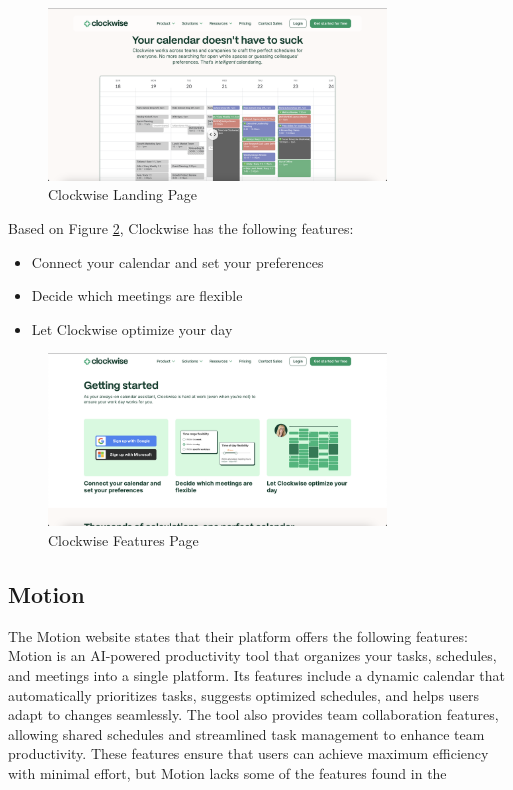 \documentclass[12pt,a4paper]{report}
\begin{document}
\begin{figure}[!h]
    \centering
    \includegraphics[width=0.8\textwidth]{images/competitors/clockwise-landing.png}
    \caption{Clockwise Landing Page}
    \label{fig:clockwise-landing}
\end{figure}


Based on Figure \ref{fig:clockwise-features}, Clockwise has the following features:
\begin{itemize}
    \item Connect your calendar and set your preferences
    \item Decide which meetings are flexible
    \item Let Clockwise optimize your day
\end{itemize}

\begin{figure}[!h]
    \centering
    \includegraphics[width=0.8\textwidth]{images/competitors/clockwise-features.png}
    \caption{Clockwise Features Page}
    \label{fig:clockwise-features}
\end{figure}

\subsection{Motion}

The Motion website states that their platform offers the following features: Motion is an AI-powered productivity tool that organizes your tasks, schedules, and meetings into a single platform. Its features include a dynamic calendar that automatically prioritizes tasks, suggests optimized schedules, and helps users adapt to changes seamlessly. The tool also provides team collaboration features, allowing shared schedules and streamlined task management to enhance team productivity. These features ensure that users can achieve maximum efficiency with minimal effort, but Motion lacks some of the features found in the 
\end{document}
